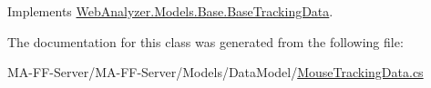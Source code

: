 Implements \hyperlink{class_web_analyzer_1_1_models_1_1_base_1_1_base_tracking_data_a461cc41b4d928c47a376aa6ea76a1b91}{Web\+Analyzer.\+Models.\+Base.\+Base\+Tracking\+Data}.



The documentation for this class was generated from the following file\+:\begin{DoxyCompactItemize}
\item 
M\+A-\/\+F\+F-\/\+Server/\+M\+A-\/\+F\+F-\/\+Server/\+Models/\+Data\+Model/\hyperlink{_mouse_tracking_data_8cs}{Mouse\+Tracking\+Data.\+cs}\end{DoxyCompactItemize}
